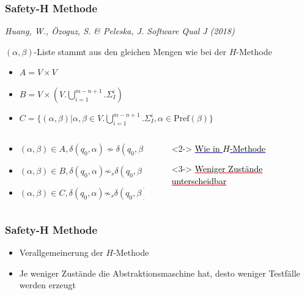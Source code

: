 \begin{frame}

\frametitle{Safety-H Methode}
\begin{center}
  \scriptsize
\emph{Huang, W., Özoguz, S. \& Peleska, J. Software Qual J (2018)}\\
\end{center}
\normalsize
$(\alpha, \beta)$-Liste stammt aus den gleichen Mengen wie bei der $H$-Methode
\begin{itemize}
    \item $A=V\times V$
    \item $B=V\times (V.\bigcup\limits_{i=1}^{m-n+1}.\Sigma_I^i)$
    \item $C=\{(\alpha,\beta)|\alpha,\beta\in V.\bigcup\limits_{i=1}^{m-n+1}.\Sigma_I^i, \alpha \in \text{Pref}(\beta)\}$
  \end{itemize}

\begin{columns}[T] %
\begin{column}{.50\textwidth}
\pause
\begin{itemize}
  \item<2-> $(\alpha, \beta) \in A, \delta(q_0,\alpha) \not \sim \delta(q_0, \beta)$
  \item<3-> $(\alpha, \beta) \in B, \delta(q_0,\alpha) \not \sim_s \delta(q_0, \beta)$
  \item<3-> $(\alpha, \beta) \in C, \delta(q_0,\alpha) \not \sim_s \delta(q_0, \beta)$
\end{itemize}
  \end{column}%
  \begin{column}{.60\textwidth}

  \begin{itemize}
  \item[]<2-> \textcolor{blue}{\underline{\textcolor{black}{Wie in $H$-Methode}}}
  \item[]<3-> \textcolor{red}{\underline{\textcolor{black}{Weniger Zustände unterscheidbar}}}
\end{itemize}
\end{column}
\end{columns}

\end{frame}

\begin{frame}
\frametitle{Safety-H Methode}
\begin{itemize}
  \item Verallgemeinerung der $H$-Methode
  \item Je weniger Zustände die Abstraktionsmaschine hat, desto weniger Testfälle werden erzeugt
\end{itemize}
\end{frame}